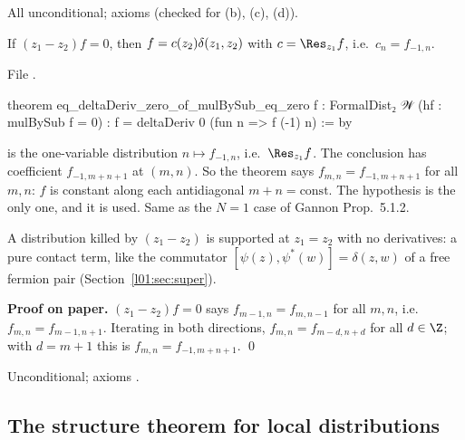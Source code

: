 \begin{status}
All unconditional; axioms  (checked for (b), (c), (d)).
\end{status}

\begin{proposition}[The case $N = 1$]\label{l01:prop:Neq1}
If $(z_1-z_2)f = 0$, then $f = c(z_2)\delta(z_1,z_2)$ with $c = \Res_{z_1}f$, i.e.\ $c_n = f_{-1,n}$.
\end{proposition}

\noindent File .
\begin{leancode}
theorem eq_deltaDeriv_zero_of_mulBySub_eq_zero {f : FormalDist₂ 𝒲} (hf : mulBySub f = 0) :
    f = deltaDeriv 0 (fun n => f (-1) n) := by
\end{leancode}

\begin{dictionary}
 is the one-variable distribution $n\mapsto f_{-1,n}$, i.e.\ $\Res_{z_1}f$. The
conclusion  has coefficient $f_{-1,m+n+1}$ at $(m,n)$. So the theorem says
$f_{m,n} = f_{-1,m+n+1}$ for all $m,n$: $f$ is constant along each antidiagonal $m+n = \text{const}$. The
hypothesis is the only one, and it is used. Same as the $N = 1$ case of Gannon Prop.~5.1.2.
\end{dictionary}

\begin{physics}
A distribution killed by $(z_1-z_2)$ is supported at $z_1 = z_2$ with no derivatives: a pure contact
term, like the commutator $[\psi(z),\psi^*(w)] = \delta(z,w)$ of a free fermion pair (Section~\ref{l01:sec:super}).
\end{physics}

\textbf{Proof on paper.} $(z_1-z_2)f = 0$ says $f_{m-1,n} = f_{m,n-1}$ for all $m,n$, i.e.\
$f_{m,n} = f_{m-1,n+1}$. Iterating in both directions, $f_{m,n} = f_{m-d,n+d}$ for all $d\in\Z$; with
$d = m+1$ this is $f_{m,n} = f_{-1,m+n+1}$. \qed

\begin{status}
Unconditional; axioms .
\end{status}

\subsection{The structure theorem for local distributions}

